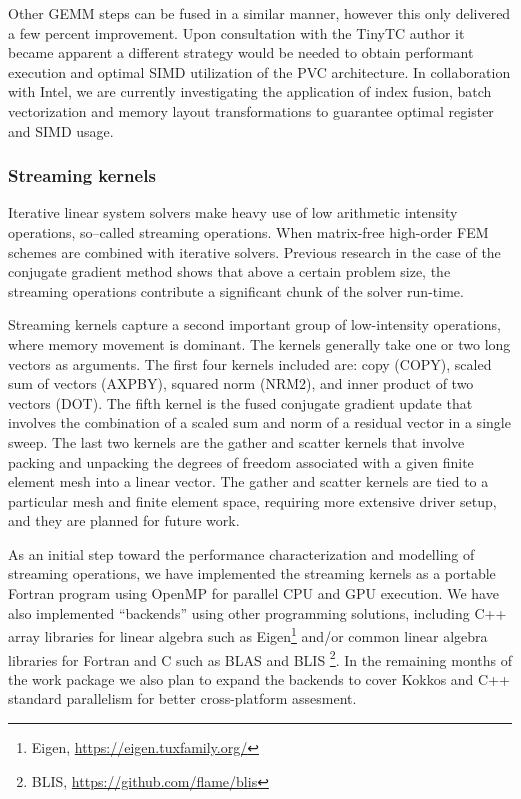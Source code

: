\documentclass[a4paper,12pt, numbers]{article}
\begin{document}
Other GEMM steps can be fused in a similar manner, however this only delivered a few percent improvement. Upon consultation with the TinyTC author it became apparent a different strategy would be needed to obtain performant execution and optimal SIMD utilization of the PVC architecture.
In collaboration with Intel, we are currently investigating the application of index fusion, batch vectorization and memory layout transformations to guarantee optimal register and SIMD usage.


\subsubsection*{Streaming kernels}

Iterative linear system solvers make heavy use of low arithmetic intensity operations, so--called streaming operations.
When matrix-free high-order FEM schemes are combined with iterative solvers. Previous research in the case of the conjugate gradient method shows that above a certain problem size, the streaming operations contribute a significant chunk of the solver run-time.

Streaming kernels capture a second important group of low-intensity operations, where memory movement is dominant.
The kernels generally take one or two long vectors as arguments. The first four kernels included are: copy (COPY), scaled sum of vectors (AXPBY), squared norm (NRM2), and inner product of two vectors (DOT). The fifth kernel is the fused conjugate gradient update that involves the combination of a scaled sum and norm of a residual vector in a single sweep. The last two kernels are the gather and scatter kernels that involve packing and unpacking the degrees of freedom associated with a given finite element mesh into a linear vector. The gather and scatter kernels are tied to a particular mesh and finite element space, requiring more extensive driver setup, and they are planned for future work. 

As an initial step toward the performance characterization and modelling of streaming operations, we have implemented the streaming kernels as a portable Fortran program using OpenMP for parallel CPU and GPU execution. We have also implemented ``backends'' using other programming solutions, including C++ array libraries for linear algebra such as Eigen\footnote{Eigen, \url{https://eigen.tuxfamily.org/}} and/or common linear algebra libraries for Fortran and C such as BLAS and BLIS \footnote{BLIS, \url{https://github.com/flame/blis}}. In the remaining months of the work package we also plan to expand the backends to cover Kokkos and C++ standard parallelism for better cross-platform assesment. 
\end{document}
